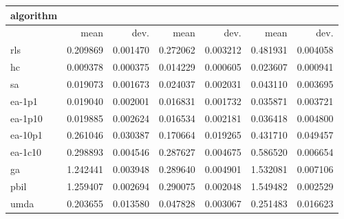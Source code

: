\begin{tabular}{@{}l*{6}{>{{}}N{1}{2}}@{}}
\toprule
{algorithm} &  &  &  \\
\midrule
& {mean} & {dev.} & {mean} & {dev.} & {mean} & {dev.} \\
\midrule
rls & 0.209869 & 0.001470 & 0.272062 & 0.003212 & 0.481931 & 0.004058 \\
 hc & 0.009378 & 0.000375 & 0.014229 & 0.000605 & 0.023607 & 0.000941 \\
 sa & 0.019073 & 0.001673 & 0.024037 & 0.002031 & 0.043110 & 0.003695 \\
 ea-1p1 & 0.019040 & 0.002001 & 0.016831 & 0.001732 & 0.035871 & 0.003721 \\
 ea-1p10 & 0.019885 & 0.002624 & 0.016534 & 0.002181 & 0.036418 & 0.004800 \\
 ea-10p1 & 0.261046 & 0.030387 & 0.170664 & 0.019265 & 0.431710 & 0.049457 \\
 ea-1c10 & 0.298893 & 0.004546 & 0.287627 & 0.004675 & 0.586520 & 0.006654 \\
 ga & 1.242441 & 0.003948 & 0.289640 & 0.004901 & 1.532081 & 0.007106 \\
 pbil & 1.259407 & 0.002694 & 0.290075 & 0.002048 & 1.549482 & 0.002529 \\
 umda & 0.203655 & 0.013580 & 0.047828 & 0.003067 & 0.251483 & 0.016623 \\
 \bottomrule
\end{tabular}
